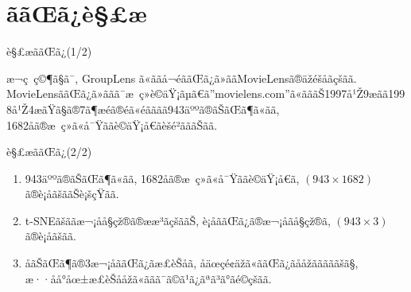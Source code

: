 \documentclass[dvipdfmx]{beamer} %
\begin{document}
\section{ããŒã¿è§£æ}
\begin{frame}{è§£æããŒã¿(1/2)}

æ¬ç ç©¶ã§ã¯, GroupLens ã«ããå¬éããŒã¿ã»ããMovieLensã®äžéšåãçšãã. MovieLensããŒã¿ã»ããã¯æ ç»è©äŸ¡ãµã€ã''movielens.com''ã«ãããŠ1997å¹Ž9æãã1998å¹Ž4æãŸã§ã®7ã¶æéã®éã«éãããã943äººã®ãŠãŒã¶ã«ãã, 1682åã®æ ç»ã«å¯Ÿããè©äŸ¡å€ãèšé²ãããŠãã. 

\begin{table}[bp]
\begin{center}
\caption{ã³ã³ãã³ãæå ±ããã³ãŠãŒã¶æå ±}   %
\label{MovieLens1}   %
\end{center}
\end{table}

\end{frame}

\begin{frame}{è§£æããŒã¿(2/2)}

\begin{enumerate}
	\item 
	943äººã®ãŠãŒã¶ã«ãã, 1682åã®æ ç»ã«å¯Ÿããè©äŸ¡å€ã, $(943 \times 1682)$ ã®è¡åãšããŠè¡šçŸãã.
	\vspace{0.2cm}
	\item 
	t-SNEãšããæ¬¡åå§çž®ã®ææ³ãçšããŠ, è¡åããŒã¿ã®æ¬¡åãå§çž®ã, $(943 \times 3)$ ã®è¡åãšãã.
	\vspace{0.2cm}
	\item 
	åãŠãŒã¶ã®$3$æ¬¡åããŒã¿ãæ­£èŠåã, åäœçé¢äžã«ããŒã¿ãååžãããããšã§, æ··åå°åœ±æ­£èŠååžã«ããã¯ã©ã¹ã¿ãªã³ã°ãé©çšãã.
\end{enumerate}
\end{frame}
\end{document}
